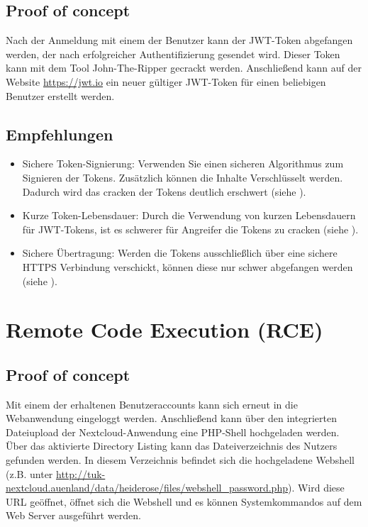 \subsection*{Proof of concept}
Nach der Anmeldung mit einem der Benutzer kann der JWT-Token abgefangen werden, der nach erfolgreicher Authentifizierung gesendet wird. Dieser Token kann mit dem Tool John-The-Ripper gecrackt werden. Anschließend kann auf der Website \url{https://jwt.io} ein neuer gültiger JWT-Token für einen beliebigen Benutzer erstellt werden. 

\subsection*{Empfehlungen}
\begin{itemize}
    \item Sichere Token-Signierung: Verwenden Sie einen sicheren Algorithmus zum Signieren der Tokens. Zusätzlich können die Inhalte Verschlüsselt werden. Dadurch wird das cracken der Tokens deutlich erschwert (siehe \cite{owaspSessionManagement}).
    \item Kurze Token-Lebensdauer: Durch die Verwendung von kurzen Lebensdauern für JWT-Tokens, ist es schwerer für Angreifer die Tokens zu cracken (siehe \cite{owaspSessionManagement}).
    \item Sichere Übertragung: Werden die Tokens ausschließlich über eine sichere HTTPS Verbindung verschickt, können diese nur schwer abgefangen werden (siehe \cite{owaspSessionManagement}).
\end{itemize}


\section{\makecvssbadge Remote Code Execution (RCE)}

\subsection*{Proof of concept}
Mit einem der erhaltenen Benutzeraccounts kann sich erneut in die Webanwendung eingeloggt werden. Anschließend kann über den integrierten Dateiupload der Nextcloud-Anwendung eine PHP-Shell hochgeladen werden. Über das aktivierte Directory Listing kann das Dateiverzeichnis des Nutzers gefunden werden. In diesem Verzeichnis befindet sich die hochgeladene Webshell (z.B. unter \url{http://tuk-nextcloud.auenland/data/heiderose/files/webshell_password.php}). Wird diese URL geöffnet, öffnet sich die Webshell und es können Systemkommandos auf dem Web Server ausgeführt werden. 

